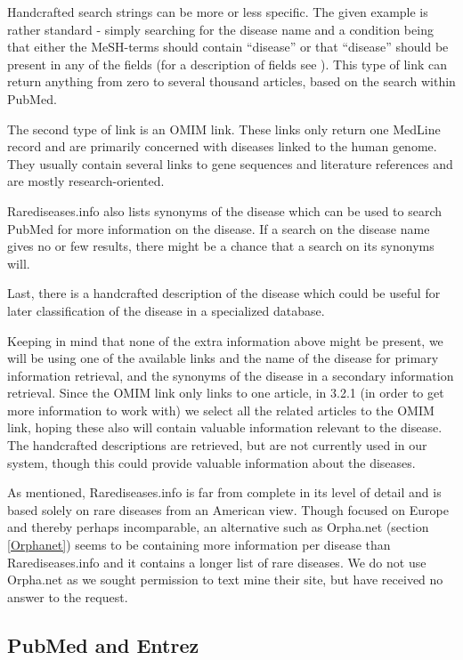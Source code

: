 Handcrafted search strings can be more or less specific. The given
example is rather standard - simply searching for the disease name and
a condition being that either the MeSH-terms should contain ``disease''
or that ``disease'' should be present in any of the fields (for a
description of fields see
\cite{PubMedHelpSearchFieldDescriptionsTags}). This type of link can
return anything from zero to several thousand articles, based on the
search within PubMed.

The second type of link is an OMIM link. These links only return one
MedLine record and are primarily concerned with diseases linked to the
human genome. They usually contain several links to gene sequences and
literature references and are mostly research-oriented.

Rarediseases.info also lists synonyms of the disease which can be used
to search PubMed for more information on the disease. If a search on
the disease name gives no or few results, there might be a chance
that a search on its synonyms will.

Last, there is a handcrafted description of the disease which could be
useful for later classification of the disease in a specialized
database.

Keeping in mind that none of the extra information above might be
present, we will be using one of the available links and the name of
the disease for primary information retrieval, and the synonyms of the
disease in a secondary information retrieval. Since the OMIM link only
links to one article, in 3.2.1  (in order to get more
information to work with) we select all the related articles to the
OMIM link, hoping these also will contain valuable information
relevant to the disease. The handcrafted descriptions are retrieved,
but are not currently used in our system, though this could provide
valuable information about the diseases. 

As mentioned, Rarediseases.info is far from complete in its level of
detail and is based solely on rare diseases from an American
view. Though focused on Europe and thereby perhaps incomparable, an
alternative such as Orpha.net (section \ref{Orphanet}) seems to be
containing more information per disease than Rarediseases.info and it
contains a longer list of rare diseases. We do not use Orpha.net
as we sought permission to text mine their site, but have
received no answer to the request.

\subsection{PubMed and Entrez\label{PubmedEntrez}}

